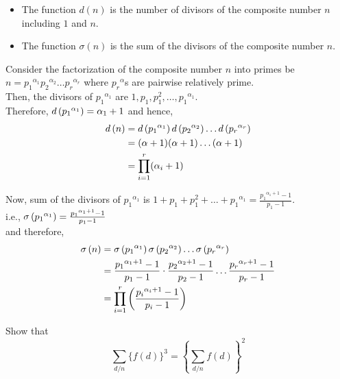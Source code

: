 \documentclass[12pt]{book}
\begin{document}
\begin{soln}\hfill
    \begin{itemize}
        \item The function $ d(n) $ is the number of divisors of the composite number $ n $ including $ 1 $ and $ n $.
        \item The function $ \sigma(n) $ is the sum of the divisors of the composite number $ n $.
    \end{itemize}

    Consider the factorization of the composite number $ n $ into primes be $ n= {p_1}^{\alpha_1}{p_2}^{\alpha_2} \dots {p_r}^{\alpha_r}$ where $ {p_r}^{\alpha} $s are pairwise relatively prime.\\ %
    Then, the divisors of $ {p_1}^{\alpha_1}  $ are $ 1,p_1,p_1^2,\dots, {p_1}^{\alpha_1} $.\\
    Therefore, $ d\left( {p_1}^{\alpha_1} \right)=\alpha_1+1 $ and hence,
    \begin{align*}
        d\left( n \right)&=d\left( {p_1}^{\alpha_1} \right)d\left( {p_2}^{\alpha_2} \right)\dots d\left( {p_r}^{\alpha_r} \right)\\
        &=(\alpha+1)(\alpha+1)\dots(\alpha+1)\\
        &= \prod_{i=1}^r (\alpha_i+1)
    \end{align*}

    Now, sum of the divisors of $ {p_1}^{\alpha_1} $ is $ 1+p_1+p_1^2+\dots+ {p_1}^{\alpha_1}=\frac{{p_1}^{\alpha_1+1}-1}{p_1-1} $.\\
    i.e., $ \sigma\left( {p_1}^{\alpha_1} \right)=\frac{{p_1}^{\alpha_1+1}-1}{p_1-1}  $\\
    and therefore,
    \begin{align*}
        \sigma\left( n \right)&=\sigma\left( {p_1}^{\alpha_1} \right)\sigma\left( {p_2}^{\alpha_2} \right)\dots\sigma\left( {p_r}^{\alpha_r} \right)\\
        &=\frac{{p_1}^{\alpha_1+1}-1}{p_1-1} \cdot \frac{{p_2}^{\alpha_2+1}-1}{p_2-1}\dots\frac{{p_r}^{\alpha_r+1}-1}{p_r-1}\\
        &= \prod_{i=1}^r \left( \frac{{p_i}^{\alpha_i+1}-1}{p_i-1} \right)
    \end{align*}
\end{soln}
\begin{qn}
    Show that
    \[\sum_{d/n}\{f(d)\}^3=\left\{ \sum_{d/n} f(d) \right\}^2\]
\end{qn}
\end{document}
